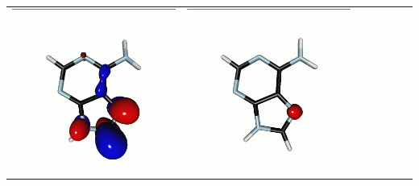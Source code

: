 \documentclass[journal=jctcce,manuscript=article]{achemso}
\begin{document}
\begin{table}[H]
\begin{tabular}{ l | c c c | c c c }
\begin{minipage}{0.2\textwidth}
        \includegraphics[scale=0.10]{NTO/Adenine_N/1p_C1.png}
    \end{minipage}
    & 
    \begin{minipage}{0.2\textwidth}
        \centering
        \includegraphics[scale=0.10]{NTO/Adenine_N/1h_Cs.png}

\end{minipage}
\end{tabular}
\end{table}
\end{document}
